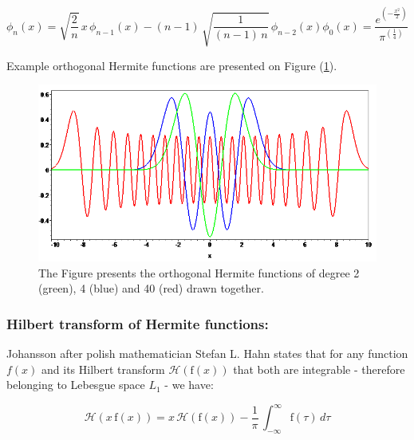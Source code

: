 \documentclass[12pt,twoside,a4paper]{article}
\numberwithin{equation}{subsection}
\numberwithin{figure}{subsection}
\begin{document}
\begin{subequations} \label{eq:hermite_recresult}
  \begin{equation}   \label{eq:hrr_weight}
    \phi_n (x) = \sqrt{\frac {2}{n}} \, x \, {\phi_{n - 1}}(x) - (n - 1) \, \sqrt{\frac {1} {(n - 1) \, n}} \, \phi_{n - 2}(x)
  \end{equation}
  \begin{equation}   \label{eq:hrr_iter}
    \phi_0 (x) = \frac {e^{( - \frac {x ^ 2} {2})}} {\pi ^{(\frac {1}{4})}}
  \end{equation}
\end{subequations}

Example orthogonal Hermite functions are presented on Figure (\ref{fig:her_plots}).

\begin{figure}
  \includegraphics[width=150mm]{img/her_plots.png}
  \caption{ The Figure presents the orthogonal Hermite functions of degree 2 (green), 4 (blue) and 40 (red) drawn together. }
  \label{fig:her_plots}
\end{figure}
 
\subsubsection*{Hilbert transform of Hermite functions:}

Johansson after polish mathematician Stefan L. Hahn \cite{hahn_hilbert} states that for any function $f(x)$ and its Hilbert transform 
$\mathcal{H}(\mathrm{f}(x))$ that both are integrable - therefore belonging to Lebesgue space $ L_1 $ - we have:

\begin{equation} \label{eg:hermite_hproperty}
  \mathcal{H}(x \, \mathrm{f}(x)) = x \, \mathcal{H}(\mathrm{f}(x)) 
    - \frac {1}{\pi } \, \int_{ - \infty } ^ {\infty}\mathrm{f}(\tau ) \, d\tau 
\end{equation}
\end{document}
